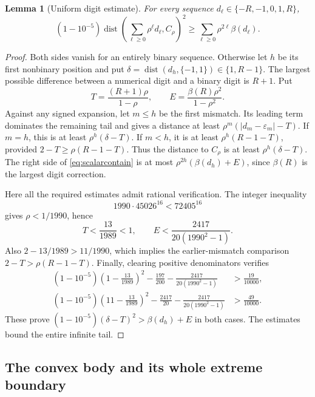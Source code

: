 \documentclass[11pt,letterpaper]{amsart}
\newtheorem{lemma}[theorem]{Lemma}
\theoremstyle{definition}
\theoremstyle{remark}
\numberwithin{equation}{section}
\DeclareMathOperator{\dist}{dist}
\begin{document}
\begin{lemma}[Uniform digit estimate]\label{lem:contain}
For every sequence \(d_\ell\in\{-R,-1,0,1,R\}\),
\begin{equation}\label{eq:scalarcontain}
 (1-10^{-5})\dist\left(\sum_{\ell\ge0}\rho^\ell d_\ell,C_\rho\right)^2
             \ge\sum_{\ell\ge0}\rho^{2\ell}\beta(d_\ell).
\end{equation}
\end{lemma}
\begin{proof}
Both sides vanish for an entirely binary sequence. Otherwise let
\(h\) be its first nonbinary position and put
\(\delta=\dist(d_h,\{-1,1\})\in\{1,R-1\}\).
The largest possible difference between a numerical digit and a
binary digit is \(R+1\). Put
\[
 T=\frac{(R+1)\rho}{1-\rho},\qquad
 E=\frac{\beta(R)\rho^2}{1-\rho^2}.
\]
Against any signed expansion, let \(m\le h\) be the first
mismatch. Its leading term dominates the remaining tail and gives
a distance at least
\(\rho^m(|d_m-\varepsilon_m|-T)\).
If \(m=h\), this is at least \(\rho^h(\delta-T)\).
If \(m<h\), it is at least \(\rho^h(R-1-T)\), provided
\(2-T\ge\rho(R-1-T)\). Thus the distance to \(C_\rho\)
is at least \(\rho^h(\delta-T)\).
The right side of \eqref{eq:scalarcontain} is at most
\(\rho^{2h}(\beta(d_h)+E)\), since \(\beta(R)\) is the
largest digit correction.

Here all the required estimates admit rational verification.
The integer inequality
\[
                  1990\cdot45026^{16}<72405^{16}
\]
gives \(\rho<1/1990\), hence
\[
 T<\frac{13}{1989}<1,\qquad
 E<\frac{2417}{20(1990^2-1)}.
\]
Also \(2-13/1989>11/1990\), which implies the earlier-mismatch
comparison \(2-T>\rho(R-1-T)\). Finally, clearing positive
denominators verifies
\[
 \begin{aligned}
 (1-10^{-5})\left(1-\frac{13}{1989}\right)^2
 -\frac{197}{200}-\frac{2417}{20(1990^2-1)}
                                      &>\frac{19}{10000},\\
 (1-10^{-5})\left(11-\frac{13}{1989}\right)^2
 -\frac{2417}{20}-\frac{2417}{20(1990^2-1)}
                                      &>\frac{49}{10000}.
 \end{aligned}
\]
These prove \((1-10^{-5})(\delta-T)^2>\beta(d_h)+E\)
in both cases. The estimates bound the entire infinite tail.
\end{proof}

\subsection{The convex body and its whole extreme boundary}
\end{document}
